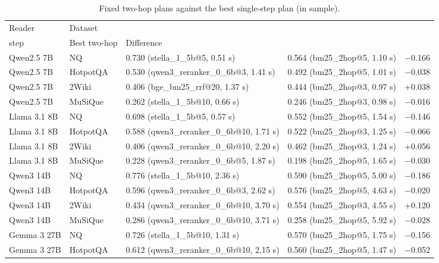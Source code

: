\begin{table}[t]
\centering\small
\setlength{\tabcolsep}{4pt}
\caption{Fixed two-hop plans against the best single-step plan (in sample).}
\label{tab:r3}
\begin{tabular*}{\linewidth}{@{\extracolsep{\fill}}llllr}
\toprule
Reader & Dataset & \begin{tabular}[b]{@{}l@{}}Best single \\ step\end{tabular} & Best two-hop & Difference \\
\midrule
Qwen2.5 7B & NQ & 0.730 (stella\_1\_5b@5, 0.51 s) & 0.564 (bm25\_2hop@5, 1.10 s) & $-$0.166 \\
Qwen2.5 7B & HotpotQA & 0.530 (qwen3\_reranker\_0\_6b@3, 1.41 s) & 0.492 (bm25\_2hop@5, 1.01 s) & $-$0.038 \\
Qwen2.5 7B & 2Wiki & 0.406 (bge\_bm25\_rrf@20, 1.37 s) & 0.444 (bm25\_2hop@3, 0.97 s) & +0.038 \\
Qwen2.5 7B & MuSiQue & 0.262 (stella\_1\_5b@10, 0.66 s) & 0.246 (bm25\_2hop@3, 0.98 s) & $-$0.016 \\
Llama 3.1 8B & NQ & 0.698 (stella\_1\_5b@5, 0.57 s) & 0.552 (bm25\_2hop@5, 1.54 s) & $-$0.146 \\
Llama 3.1 8B & HotpotQA & 0.588 (qwen3\_reranker\_0\_6b@10, 1.71 s) & 0.522 (bm25\_2hop@3, 1.25 s) & $-$0.066 \\
Llama 3.1 8B & 2Wiki & 0.406 (qwen3\_reranker\_0\_6b@10, 2.20 s) & 0.462 (bm25\_2hop@3, 1.24 s) & +0.056 \\
Llama 3.1 8B & MuSiQue & 0.228 (qwen3\_reranker\_0\_6b@5, 1.87 s) & 0.198 (bm25\_2hop@5, 1.65 s) & $-$0.030 \\
Qwen3 14B & NQ & 0.776 (stella\_1\_5b@10, 2.36 s) & 0.590 (bm25\_2hop@5, 5.00 s) & $-$0.186 \\
Qwen3 14B & HotpotQA & 0.596 (qwen3\_reranker\_0\_6b@3, 2.62 s) & 0.576 (bm25\_2hop@5, 4.63 s) & $-$0.020 \\
Qwen3 14B & 2Wiki & 0.434 (qwen3\_reranker\_0\_6b@10, 3.70 s) & 0.554 (bm25\_2hop@3, 4.55 s) & +0.120 \\
Qwen3 14B & MuSiQue & 0.286 (qwen3\_reranker\_0\_6b@10, 3.71 s) & 0.258 (bm25\_2hop@5, 5.92 s) & $-$0.028 \\
Gemma 3 27B & NQ & 0.726 (stella\_1\_5b@10, 1.31 s) & 0.570 (bm25\_2hop@5, 1.75 s) & $-$0.156 \\
Gemma 3 27B & HotpotQA & 0.612 (qwen3\_reranker\_0\_6b@10, 2.15 s) & 0.560 (bm25\_2hop@5, 1.47 s) & $-$0.052 \\

\end{tabular*}
\end{table}
